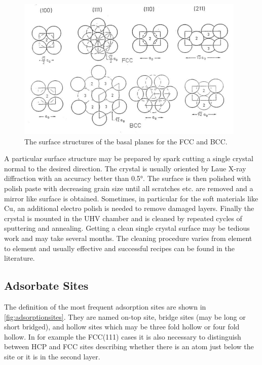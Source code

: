 \begin{figure}[h!]
	\begin{center}
	\includegraphics[scale=4]{figures/09_03.png}
	\caption{The surface structures of the basal planes for the FCC and BCC.}
	\label{fig:surfaces}
	\end{center}
\end{figure}

A particular surface structure may be prepared by spark cutting a single crystal normal to the desired direction. The crystal is usually oriented by Laue X-ray diffraction with an accuracy better than \ang{0.5}. The surface is then polished with polish paste with decreasing grain size until all scratches etc. are removed and a mirror like surface is obtained. Sometimes, in particular for the soft materials like Cu, an additional electro polish is needed to remove damaged layers. Finally the crystal is mounted in the UHV chamber and is cleaned by repeated cycles of sputtering and annealing. Getting a clean single crystal surface may be tedious work and may take several months. The cleaning procedure varies from element to element and usually effective and successful recipes can be found in the literature.

\subsection{Adsorbate Sites}
The definition of the most frequent  adsorption sites are shown in \autoref{fig:adsorptionsites}. They are named on-top site, bridge sites  (may be long or short bridged), and hollow sites which may be three fold hollow or four fold hollow. In for example the FCC(111) cases it is also necessary to distinguish between HCP and FCC sites describing whether there is an atom just below the site or it is in the second layer.

